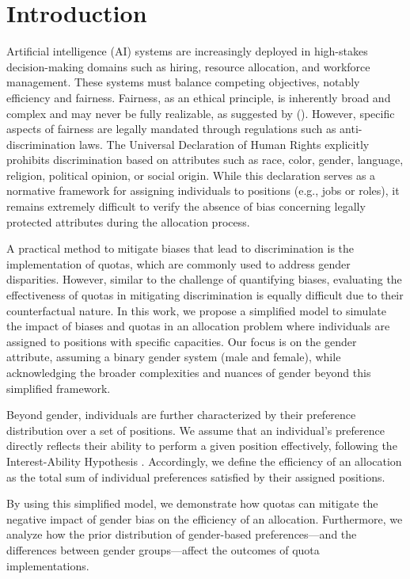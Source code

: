 \documentclass[letterpaper]{article}
\newcommand{\citet}[1]{\citeauthor{#1} (\citeyear{#1})}
\begin{document}
\section{Introduction}
Artificial intelligence (AI) systems are increasingly deployed in high-stakes decision-making domains such as hiring, resource allocation, and workforce management. These systems must balance competing objectives, notably efficiency and fairness. Fairness, as an ethical principle, is inherently broad and complex and may never be fully realizable, as suggested by \citet{Peterson_Hamrouni_2022}. However, specific aspects of fairness are legally mandated through regulations such as anti-discrimination laws. The Universal Declaration of Human Rights \cite{udhr1948} explicitly prohibits discrimination based on attributes such as race, color, gender, language, religion, political opinion, or social origin. While this declaration serves as a normative framework for assigning individuals to positions (e.g., jobs or roles), it remains extremely difficult to verify the absence of bias concerning legally protected attributes during the allocation process.

A practical method to mitigate biases that lead to discrimination is the implementation of quotas, which are commonly used to address gender disparities. However, similar to the challenge of quantifying biases, evaluating the effectiveness of quotas in mitigating discrimination is equally difficult due to their counterfactual nature. In this work, we propose a simplified model to simulate the impact of biases and quotas in an allocation problem where individuals are assigned to positions with specific capacities. Our focus is on the gender attribute, assuming a binary gender system (male and female), while acknowledging the broader complexities and nuances of gender beyond this simplified framework.

Beyond gender, individuals are further characterized by their preference distribution over a set of positions. We assume that an individual's preference directly reflects their ability to perform a given position effectively, following the Interest-Ability Hypothesis \cite{jintelligence10030043}. Accordingly, we define the efficiency of an allocation as the total sum of individual preferences satisfied by their assigned positions.

By using this simplified model, we demonstrate how quotas can mitigate the negative impact of gender bias on the efficiency of an allocation. Furthermore, we analyze how the prior distribution of gender-based preferences—and the differences between gender groups—affect the outcomes of quota implementations.
\end{document}
